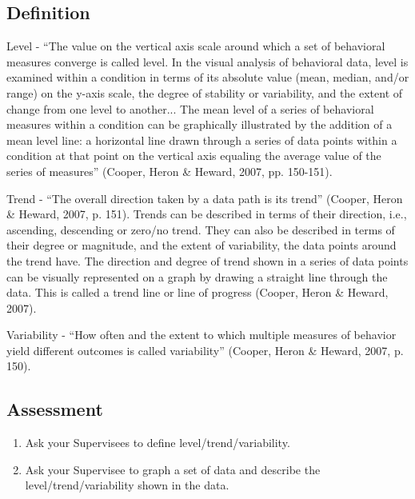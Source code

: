 \subsection{Definition}
Level - ``The value on the vertical axis scale around which a set of behavioral measures converge is called level. In the visual analysis of behavioral data, level is examined within a condition in terms of its absolute value (mean, median, and/or range) on the y-axis scale, the degree of stability or variability, and the extent of change from one level to another... The mean level of a series of behavioral measures within a condition can be graphically illustrated by the addition of a mean level line: a horizontal line drawn through a series of data points within a condition at that point on the vertical axis equaling the average value of the series of measures'' (Cooper, Heron \& Heward, 2007, pp. 150-151). 

Trend - ``The overall direction taken by a data path is its trend'' (Cooper, Heron \& Heward, 2007, p. 151). Trends can be described in terms of their direction, i.e., ascending, descending or zero/no trend. They can also be described in terms of their degree or magnitude, and the extent of variability, the data points around the trend have. The direction and degree of trend shown in a series of data points can be visually represented on a graph by drawing a straight line through the data. This is called a trend line or line of progress (Cooper, Heron \& Heward, 2007).

Variability - ``How often and the extent to which multiple measures of behavior yield different outcomes is called variability'' (Cooper, Heron \& Heward, 2007, p. 150).
%
\subsection{Assessment}
\begin{enumerate}
\item Ask your Supervisees to define level/trend/variability.
\item Ask your Supervisee to graph a set of data and describe the level/trend/variability shown in the data.
\end{enumerate}
%
